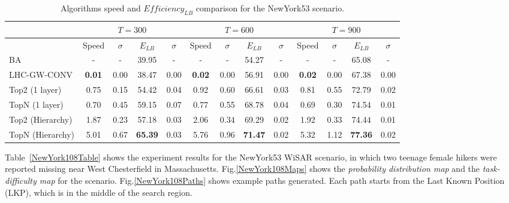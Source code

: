 \begin{center}
\begin{table*}[hbtp]
{
\scriptsize
\hfill{}
\setlength{\extrarowheight}{1.5pt}
\begin{tabular}
{|l|c|c|c|c|c|c|c|c|c|c|c|c|}
\hline
& \multicolumn{4}{|c|}{$T=300$} & \multicolumn{4}{|c|}{$T=600$} & \multicolumn{4}{|c|}{$T=900$} \\ 
\hline
& Speed & $\sigma$ & $\mathit{E_{LB}}$ & $\sigma$ & Speed & $\sigma$ & $\mathit{E_{LB}}$ & $\sigma$ & Speed & $\sigma$ & $\mathit{E_{LB}}$ & $\sigma$\\ 
\hline
BA & - & - & 39.95 & - & - & - & 54.27 & - & - & - & 65.08 & - \\ 
\hline
LHC-GW-CONV & \textbf{0.01} & 0.00 & 38.47 & 0.00 & \textbf{0.02} & 0.00 & 56.91 & 0.00 & \textbf{0.02} & 0.00 & 67.38 & 0.00\\ 
\hline
Top2 (1 layer) & 0.75 & 0.15 & 54.42 & 0.04 & 0.92 & 0.60 & 66.61 & 0.03 & 0.81 & 0.55 & 72.79 & 0.02\\ 
\hline
TopN (1 layer) & 0.70 & 0.45 & 59.15 & 0.07 & 0.77 & 0.55 & 68.78 & 0.04 & 0.69 & 0.30 & 74.54 & 0.01\\ 
\hline
Top2 (Hierarchy) & 1.87 & 0.23 & 57.18 & 0.03 & 2.06 & 0.34 & 69.29 & 0.02 & 1.92 & 0.33 & 74.44 & 0.01\\ 
\hline
TopN (Hierarchy) & 5.01 & 0.67 & \textbf{65.39} & 0.03 & 5.76 & 0.96 & \textbf{71.47} & 0.02 & 5.32 & 1.12 & \textbf{77.36} & 0.02\\ 
\hline
\end{tabular}}
\medskip
\caption{Algorithms speed and $\mathit{Efficiency_{LB}}$ comparison for the NewYork53 scenario.}
\label{NewYork53Table}
\vspace*{-5ex}
\end{table*}
\end{center}


Table~\ref{NewYork108Table} shows the experiment results for the NewYork53 WiSAR scenario, in which two teenage female hikers were reported missing near West Chesterfield in Massachusetts. Fig.\ref{NewYork108Maps} shows the \textit{probability distribution map} and the \textit{task-difficulty map} for the scenario. Fig.\ref{NewYork108Paths} shows example paths generated. Each path starts from the Last Known Position (LKP), which is in the middle of the search region.

